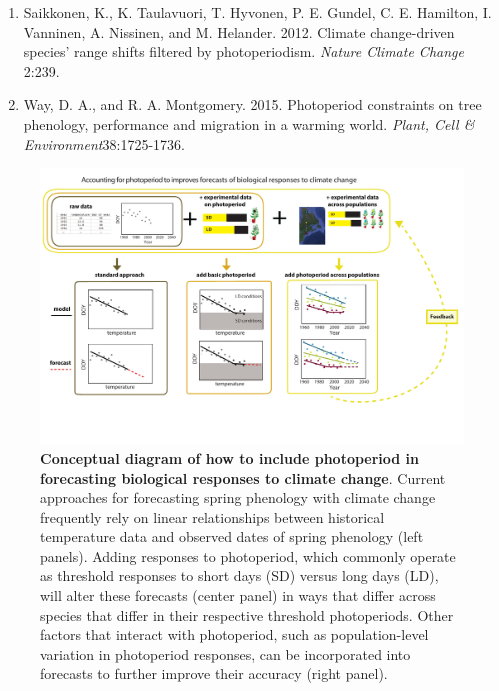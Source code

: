 \documentclass[11pt,a4paper]{letter}
\begin{document}
\begin{letter}{}
\begin{footnotesize}
\begin{enumerate}
\item Saikkonen, K., K. Taulavuori, T. Hyvonen, P. E. Gundel, C. E. Hamilton, I. Vanninen, A. Nissinen, and M. Helander. 2012. Climate change-driven species' range shifts filtered by photoperiodism. \emph{Nature Climate Change} 2:239.

\item Way, D. A., and R. A. Montgomery. 2015. Photoperiod constraints on tree phenology, performance and migration in a warming world. \emph{Plant, Cell \& Environment}38:1725-1736.

\end{enumerate}
\end{footnotesize}

\begin{figure}[p]

\includegraphics[width=180mm,scale=0.5]{..//..//analyses/photoperiod/figures/photocondiag6.pdf} 
\caption{\textbf{Conceptual diagram of how to include photoperiod in forecasting biological responses to climate change}. Current approaches for forecasting spring phenology with climate change frequently rely on linear relationships between historical temperature data and observed dates of spring phenology (left panels). Adding responses to photoperiod, which commonly operate as threshold responses to short days (SD) versus long days (LD), will alter these forecasts (center panel) in ways that differ across species that differ in their respective threshold photoperiods. Other factors that interact with photoperiod, such as population-level variation  in photoperiod responses, can be incorporated into forecasts to further improve their accuracy (right panel).}
 \label{fig:condiag}
 \end{figure}

\end{letter}
\end{document}
